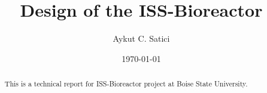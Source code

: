\title{Design of the ISS-Bioreactor}
\author         {Aykut C. Satici}
\date{\today}

\begin{abstract}
This is a technical report for ISS-Bioreactor project at Boise State University.
\end{abstract}

\maketitle

